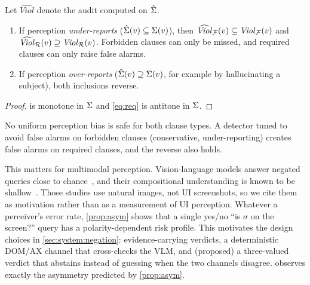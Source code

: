 \begin{proposition}
\label{prop:asym}
Let $\widehat{\mathit{Viol}}$ denote the audit computed on $\hat{\Sigma}$.
\begin{enumerate}
  \item If perception \emph{under-reports} ($\hat{\Sigma}(v)\subseteq\Sigma(v)$), then
    $\widehat{\mathit{Viol}}_{\mathcal{F}}(v)\subseteq\mathit{Viol}_{\mathcal{F}}(v)$ and
    $\widehat{\mathit{Viol}}_{\mathcal{R}}(v)\supseteq\mathit{Viol}_{\mathcal{R}}(v)$. Forbidden
    clauses can only be missed, and required clauses can only raise false
    alarms.
  \item If perception \emph{over-reports} ($\hat{\Sigma}(v)\supseteq\Sigma(v)$, for
    example by hallucinating a subject), both inclusions reverse.
\end{enumerate}
\end{proposition}
\begin{proof}
 is monotone in $\Sigma$ and \cref{eq:req} is antitone in $\Sigma$.
\end{proof}

\begin{corollary}
No uniform perception bias is safe for both clause types. A detector tuned to
avoid false alarms on forbidden clauses (conservative, under-reporting) creates
false alarms on required clauses, and the reverse also holds.
\end{corollary}

This matters for multimodal perception. Vision-language models answer negated
queries close to chance~\cite{alhamoud2025negation}, and their compositional
understanding is known to be shallow~\cite{yuksekgonul2023aro,ma2023crepe}.
Those studies use natural images, not UI screenshots, so we cite them as
motivation rather than as a measurement of UI perception. Whatever a
perceiver's error rate, \cref{prop:asym} shows that a single yes/no ``is
$\sigma$ on the screen?'' query has a polarity-dependent risk profile. This motivates the design
choices in \cref{sec:system:negation}: evidence-carrying verdicts, a
deterministic DOM/AX channel that cross-checks the VLM, and (proposed) a
three-valued verdict that abstains instead of guessing when the two channels
disagree.  observes exactly the asymmetry predicted by
\cref{prop:asym}.
